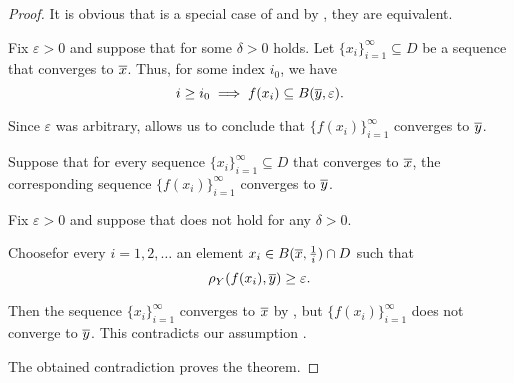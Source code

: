 \begin{proof}
  It is obvious that  is a special case of  and by , they are equivalent.

   Fix \( \varepsilon > 0 \) and suppose that for some \( \delta > 0 \)  holds. Let \( \{ x_i \}_{i=1}^\infty \subseteq D \) be a sequence that converges to \( \overline{x} \). Thus, for some index \( i_0 \), we have
  \begin{equation*}
    i \geq i_0 \implies f(x_i) \subseteq B(\overline{y}, \varepsilon).
  \end{equation*}

   Since \( \varepsilon \) was arbitrary,  allows us to conclude that \( \{ f(x_i) \}_{i=1}^\infty \) converges to \( \overline{y} \).

    Suppose that for every sequence \( \{ x_i \}_{i=1}^\infty \subseteq D \) that converges to \( \overline{x} \), the corresponding sequence \( \{ f(x_i) \}_{i=1}^\infty \) converges to \( \overline{y} \).

   Fix \( \varepsilon > 0 \) and suppose that  does not hold for any \( \delta > 0 \).

   Choose\AOC for every \( i = 1, 2, \ldots \) an element \( x_i \in B(\overline{x}, \tfrac 1 i) \cap D \) such that
   \begin{equation*}
     \rho_Y(f(x_i), \overline{y}) \geq \varepsilon.
   \end{equation*}

   Then the sequence \( \{ x_i \}_{i=1}^\infty \) converges to \( \overline{x} \) by , but \(\{ f(x_i) \}_{i=1}^\infty \) does not converge to \( \overline{y} \). This contradicts our assumption .

   The obtained contradiction proves the theorem.
\end{proof}

